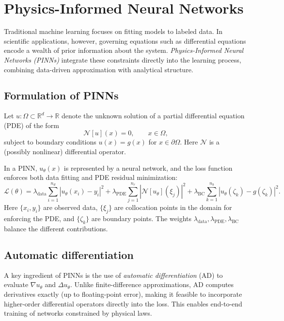 \section{Physics-Informed Neural Networks}
\label{sec:pinns}

Traditional machine learning focuses on fitting models to labeled data. 
In scientific applications, however, governing equations such as differential 
equations encode a wealth of prior information about the system. 
\emph{Physics-Informed Neural Networks (PINNs)} integrate these constraints 
directly into the learning process, combining data-driven approximation 
with analytical structure.  

\subsection{Formulation of PINNs}
Let $u:\Omega \subset \mathbb{R}^d \to \mathbb{R}$ denote the unknown solution 
of a partial differential equation (PDE) of the form
\begin{equation}
  \mathcal{N}[u](x) = 0, \qquad x \in \Omega,
\end{equation}
subject to boundary conditions $u(x)=g(x)$ for $x\in\partial\Omega$.  
Here $\mathcal{N}$ is a (possibly nonlinear) differential operator.  

In a PINN, $u_\theta(x)$ is represented by a neural network, 
and the loss function enforces both data fitting and PDE residual minimization:
\begin{equation}
  \mathcal{L}(\theta) = 
  \lambda_\text{data} \sum_{i=1}^{n_d} |u_\theta(x_i)-y_i|^2
  + \lambda_\text{PDE} \sum_{j=1}^{n_r} |\mathcal{N}[u_\theta](\xi_j)|^2
  + \lambda_\text{BC} \sum_{k=1}^{n_b} |u_\theta(\zeta_k)-g(\zeta_k)|^2.
\end{equation}
Here $\{x_i,y_i\}$ are observed data, $\{\xi_j\}$ are collocation points in 
the domain for enforcing the PDE, and $\{\zeta_k\}$ are boundary points.  
The weights $\lambda_\text{data}, \lambda_\text{PDE}, \lambda_\text{BC}$ 
balance the different contributions.  

\subsection{Automatic differentiation}
A key ingredient of PINNs is the use of \emph{automatic differentiation} (AD) 
to evaluate $\nabla u_\theta$ and $\Delta u_\theta$. Unlike finite-difference 
approximations, AD computes derivatives exactly (up to floating-point error), 
making it feasible to incorporate higher-order differential operators directly 
into the loss. This enables end-to-end training of networks constrained by 
physical laws.  

